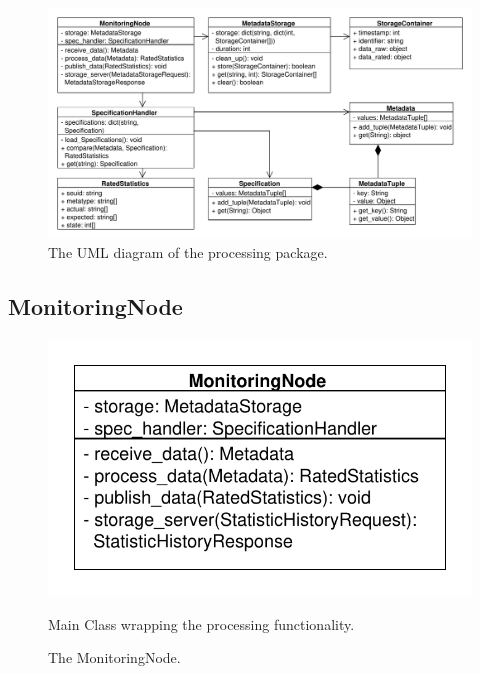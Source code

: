 \begin{figure}[!ht]
\begin{center}
\includegraphics[width=1.0\linewidth]{./diagram_pictures/processing.pdf}
\caption{The UML diagram of the processing package.}
\end{center}
\end{figure}

\mbox{}

\newpage

\subsection{MonitoringNode}
\begin{figure}[htbp]
	\begin{minipage}[t]{7cm}
		\vspace{0pt}
		\centering
		\includegraphics[scale=0.6]{./diagram_pictures/MonitoringNode.pdf}
		\caption{The MonitoringNode.}
	\end{minipage}
	\hfill
	\begin{minipage}[t]{8cm}
		\vspace{10pt}
		Main Class wrapping the processing functionality.
	\end{minipage}
\end{figure}

